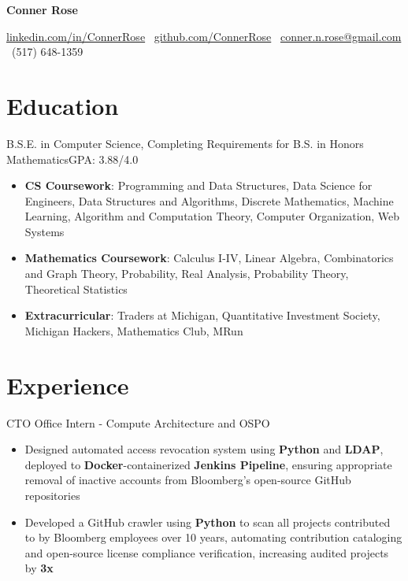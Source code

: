 \documentclass[letterpaper,11pt]{article}
\begin{document}

\begin{center}
    \Huge{\textbf{Conner Rose}} \\
    \small
    \begin{center}
        \href{https://linkedin.com/in/ConnerRose}{linkedin.com/in/ConnerRose}
        \ \href{https://github.com/ConnerRose}{github.com/ConnerRose}
        \ \href{mailto:conner.n.rose@gmail.com}{conner.n.rose@gmail.com}
        \ (517) 648-1359
    \end{center}
\end{center}

\section{Education}
{B.S.E. in Computer Science, Completing Requirements for B.S. in Honors Mathematics}{GPA: 3.88/4.0}
\begin{itemize}
    \item \textbf{CS Coursework}: Programming and Data Structures, Data Science for
          Engineers, Data Structures and Algorithms, Discrete Mathematics, Machine
          Learning, Algorithm and Computation Theory, Computer Organization, Web Systems
    \item \textbf{Mathematics Coursework}: Calculus I-IV, Linear Algebra, Combinatorics
          and Graph Theory, Probability, Real Analysis, Probability Theory, Theoretical
          Statistics
    \item \textbf{Extracurricular}: Traders at Michigan, Quantitative Investment Society,
          Michigan Hackers, Mathematics Club, MRun
\end{itemize}

\section{Experience}
{CTO Office Intern - Compute Architecture and OSPO}{}
\begin{itemize}
    \item Designed automated access revocation system using \textbf{Python} and
          \textbf{LDAP}, deployed to \textbf{Docker}-containerized \textbf{Jenkins
              Pipeline}, ensuring appropriate removal of inactive accounts from Bloomberg's
          open-source GitHub repositories
    \item Developed a GitHub crawler using \textbf{Python} to scan all projects
          contributed to by Bloomberg employees over 10 years, automating contribution
          cataloging and open-source license compliance verification, increasing audited
          projects by \textbf{3x}
\end{itemize}
\end{document}
